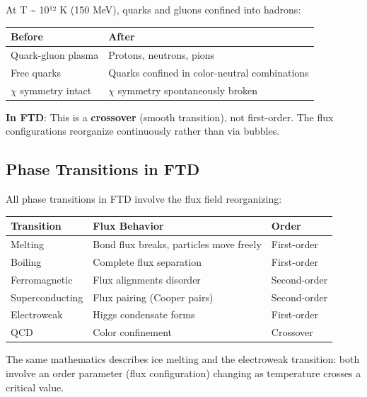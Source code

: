 \documentclass[
  11pt,
  letterpaper,
  twoside,
  openright]{book}
\begin{document}
At T \textasciitilde{} 10¹² K (150 MeV), quarks and gluons confined into
hadrons:

\begin{longtable}[]{@{}ll@{}}
\toprule\noalign{}
Before & After \\
\midrule\noalign{}
\endhead
\bottomrule\noalign{}
\endlastfoot
Quark-gluon plasma & Protons, neutrons, pions \\
Free quarks & Quarks confined in color-neutral combinations \\
\(\chi\) symmetry intact & \(\chi\) symmetry spontaneously broken \\
\end{longtable}

\textbf{In FTD}: This is a \textbf{crossover} (smooth transition), not
first-order. The flux configurations reorganize continuously rather than
via bubbles.

\subsection{Phase Transitions in FTD}\label{phase-transitions-in-ftd}

All phase transitions in FTD involve the flux field reorganizing:

\begin{longtable}[]{@{}lll@{}}
\toprule\noalign{}
Transition & Flux Behavior & Order \\
\midrule\noalign{}
\endhead
\bottomrule\noalign{}
\endlastfoot
Melting & Bond flux breaks, particles move freely & First-order \\
Boiling & Complete flux separation & First-order \\
Ferromagnetic & Flux alignments disorder & Second-order \\
Superconducting & Flux pairing (Cooper pairs) & Second-order \\
Electroweak & Higgs condensate forms & First-order \\
QCD & Color confinement & Crossover \\
\end{longtable}

\begin{tcolorbox}[enhanced jigsaw, coltitle=black, colbacktitle=quarto-callout-note-color!10!white, toprule=.15mm, colframe=quarto-callout-note-color-frame, arc=.35mm, opacityback=0, bottomtitle=1mm, toptitle=1mm, breakable, colback=white, titlerule=0mm, opacitybacktitle=0.6, title=\textcolor{quarto-callout-note-color}{\faInfo}\hspace{0.5em}{Universal Physics}, rightrule=.15mm, bottomrule=.15mm, leftrule=.75mm, left=2mm]

The same mathematics describes ice melting and the electroweak
transition: both involve an order parameter (flux configuration)
changing as temperature crosses a critical value.

\end{tcolorbox}
\end{document}
